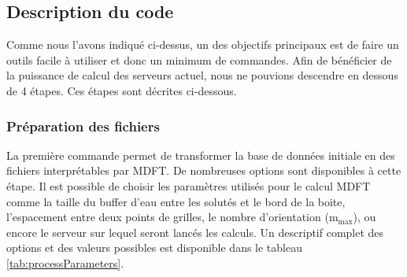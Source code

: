 \subsection{Description du code}
Comme nous l'avons indiqué ci-dessus, un des objectifs principaux est de faire un outils facile à utiliser et donc un minimum de commandes. Afin de bénéficier de la puissance de calcul des serveurs actuel, nous ne pouvions descendre en dessous de 4 étapes. Ces étapes sont décrites ci-dessous.

\subsubsection{Préparation des fichiers}
La première commande permet de transformer la base de données initiale en des fichiers interprétables par MDFT. De nombreuses options sont disponibles à cette étape. Il est possible de choisir les paramètres utilisés pour le calcul MDFT comme la taille du buffer d'eau entre les solutés et le bord de la boite, l'espacement entre deux points de grilles, le nombre d'orientation ($\mathrm{m}_\mathrm{max}$), ou encore le serveur sur lequel seront lancés les calculs. Un descriptif complet des options et des valeurs possibles est disponible dans le tableau \ref{tab:processParameters}.



